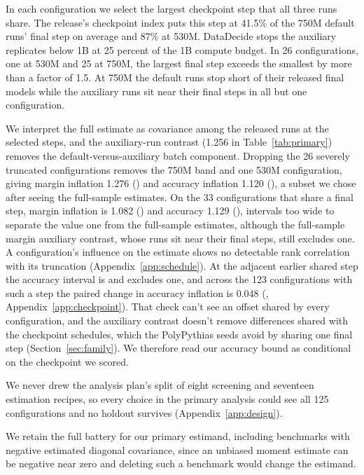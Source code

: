 In each configuration we select the largest checkpoint step that all three runs share. The release's checkpoint index puts this step at 41.5\% of the 750M default runs' final step on average and 87\% at 530M. DataDecide stops the auxiliary replicates below 1B at 25 percent of the 1B compute budget. In 26 configurations, one at 530M and 25 at 750M, the largest final step exceeds the smallest by more than a factor of 1.5. At 750M the default runs stop short of their released final models while the auxiliary runs sit near their final steps in all but one configuration.

We interpret the full estimate as covariance among the released runs at the selected steps, and the auxiliary-run contrast (1.256 in Table~\ref{tab:primary}) removes the default-versus-auxiliary batch component. Dropping the 26 severely truncated configurations removes the 750M band and one 530M configuration, giving margin inflation 1.276 () and accuracy inflation 1.120 (), a subset we chose after seeing the full-sample estimates. On the 33 configurations that share a final step, margin inflation is 1.082 () and accuracy 1.129 (), intervals too wide to separate the value one from the full-sample estimates, although the full-sample margin auxiliary contrast, whose runs sit near their final steps, still excludes one. A configuration's influence on the estimate shows no detectable rank correlation with its truncation (Appendix~\ref{app:schedule}). At the adjacent earlier shared step the accuracy interval is  and excludes one, and across the 123 configurations with such a step the paired change in accuracy inflation is 0.048 (, Appendix~\ref{app:checkpoint}). That check can't see an offset shared by every configuration, and the auxiliary contrast doesn't remove differences shared with the checkpoint schedules, which the PolyPythias seeds avoid by sharing one final step (Section~\ref{sec:family}). We therefore read our accuracy bound as conditional on the checkpoint we scored.

We never drew the analysis plan's split of eight screening and seventeen estimation recipes, so every choice in the primary analysis could see all 125 configurations and no holdout survives (Appendix~\ref{app:design}).

We retain the full battery for our primary estimand, including benchmarks with negative estimated diagonal covariance, since an unbiased moment estimate can be negative near zero and deleting such a benchmark would change the estimand.

